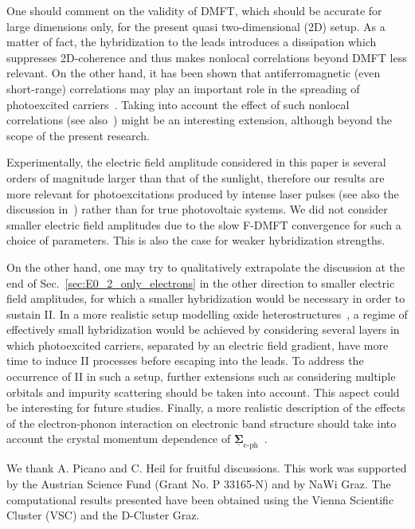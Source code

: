 \documentclass[aps,prb,groupedaddress,showpacs,twocolumn,superscriptaddress,10pt]{revtex4-2}
\newcommand{\mat}[1]{\bm{#1}} %
\newcommand{\kel}[1]{\underline{#1}} %
\newcommand{\resub}[1]{{\color{hblue} #1}}
\begin{document}
\resub{One should comment on the validity of DMFT, which should be accurate for large dimensions only, for the present quasi two-dimensional (2D) setup. As a matter of fact, the hybridization to the leads introduces a dissipation which suppresses 2D-coherence and thus makes nonlocal correlations beyond DMFT less relevant.
On the other hand, it has been shown that antiferromagnetic (even short-range) correlations may play an important role in the spreading of photoexcited carriers~\cite{ec.we.14}. 
Taking into account the effect of such nonlocal correlations (see also~\cite{ro.ha.18}) might be an interesting extension, although beyond the scope of the present research.}

Experimentally, the electric field amplitude considered in this paper is several orders of magnitude larger than that of the sunlight, therefore our results are more relevant for photoexcitations produced by intense laser pulses (see also the discussion in~\cite{mu.we.18}) rather than for true photovoltaic systems. \resub{We did not consider smaller electric field amplitudes due to the slow F-DMFT convergence for such a choice of parameters. This is also the case for weaker hybridization strengths.} 
 
On the other hand, one may try to qualitatively extrapolate the discussion at the end of Sec.~\ref{sec:E0_2_only_electrons} in the other direction to smaller electric field amplitudes, for which a smaller hybridization would be necessary in order to sustain II. In a more realistic setup modelling oxide heterostructures~\cite{as.bl.13,pe.be.19}, a regime of effectively small hybridization would be achieved by considering several layers in which photoexcited carriers, separated by an electric field gradient, have more time to induce II processes before escaping into the leads. To address the occurrence of II in such a setup, further extensions such as considering multiple orbitals and impurity scattering should be taken into account. This aspect could be interesting for future studies.    
 \resub{Finally, a more realistic description of the effects of the electron-phonon interaction on electronic band structure should take into account the crystal momentum dependence of $\kel{\mat{\Sigma}}_{\text{e-ph}}$~\cite{gius.17}.} 
     
    
\acknowledgments  

We thank A. Picano \resub{and C. Heil} for fruitful discussions. This work was supported by the Austrian Science Fund \resub{(Grant No. P 33165-N) and by} NaWi Graz. The computational results presented have been obtained using the Vienna Scientific Cluster (VSC) and the D-Cluster Graz.
 
    
 
 
\end{document}
